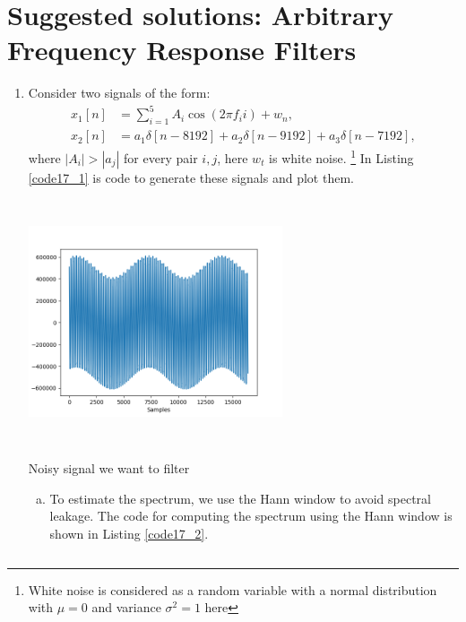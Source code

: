 \newpage
\section{Suggested solutions: Arbitrary Frequency Response Filters}
\begin{enumerate}
\item Consider two signals of the form:
\begin{align*}
    x_{1}[n]&=\sum_{i=1}^{5}A_{i}\cos(2\pi f_{i}i)+w_{n}, \\
    x_{2}[n]&=a_1\delta[n-8192] + a_2\delta[n-9192] + a_3\delta[n-7192],
\end{align*}
where $|A_{i}|>|a_{j}|$ for every pair $i,j$, here $w_t$ is white noise.
\footnote{White noise is considered as a random variable with a normal distribution 
with $\mu=0$ and variance $\sigma^{2}=1$ here} In Listing \ref{code17_1} is code to generate these signals and plot them. 


\begin{marginfigure}
    \centering
    \includegraphics[width=7.5cm,height=7.2cm]{ch17/figures/ex17_1.png}
    \caption{Noisy signal we want to filter}
    \label{fig16_1}
\end{marginfigure}

\begin{enumerate}[a)]
\item To estimate the spectrum, we use the Hann window to avoid spectral leakage. 
The code for computing the spectrum using the Hann window is shown in Listing \ref{code17_2}.

\begin{lstlisting}[language=Python, caption=Spectrum for noisy signal in Figure \ref{fig17_1},label=code17_2]


\end{lstlisting}
\end{enumerate}
\end{enumerate}
